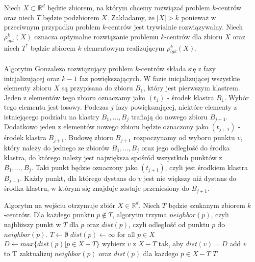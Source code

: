 \noindent
Niech $X \subset \mathbb{R}^{d}$ będzie zbiorem, na którym chcemy rozwiązać problem $k$-centrów oraz niech $T$ będzie podzbiorem $X$.
Zakładamy, że $|X| > k$ ponieważ w przeciwnym przypadku problem $k$-centrów jest trywialnie rozwiązywalny.
Niech $\rho_{opt}^{k}(X)$ oznacza optymalne rozwiązanie problemu $k$-centrów dla zbioru $X$ oraz niech $T^{*}$ będzie zbiorem $k$ elementowym realizującym $\rho_{opt}^{k}(X)$.
\\~\\
Algorytm Gonzaleza rozwiązujący problem $k$-centrów składa się z fazy inicjalizującej oraz $k-1$ faz powiększających.
W fazie inicjalizującej wszystkie elementy zbioru $X$ są przypisana do zbioru $B_{1}$, który jest pierwszym klastrem.
Jeden z elementów tego zbioru oznaczamy jako $(t_{1})$ - środek klastra $B_{1}$.
Wybór tego elementu jest losowy.
Podczas $j$ fazy powiększającej, niektóre elementy z istniejącego podziału na klastry $B_{1}, \dots, B_{j}$ trafiają do nowego zbioru $B_{j+1}$.
Dodatkowo jeden z elementów nowego zbioru będzie oznaczony jako $(t_{j+1})$ - środek klastra $B_{j+1}$.
Budowę zbioru $B_{j+1}$ rozpoczynamy od wyboru punktu $v$, który należy do jednego ze zbiorów $B_{1}, \dots, B_{j}$ oraz jego odległość do środka klastra, do którego należy jest największa spośród wszystkich punktów z $B_{1}, \dots, B_{j}$. 
Taki punkt będzie oznaczony jako $(t_{j+1})$, czyli jest środkiem klastra $B_{j+1}$.
Każdy punkt, dla którego dystans do $v$ jest nie większy niż dystans do środka klastru, w którym się znajduje zostaje przeniesiony do $B_{j+1}$.
\begin{algorithm}
    \caption{}
\begin{algorithmic}
    \State Algorytm na wejściu otrzymuje zbiór $X \in \mathbb{R}^{d}$.
    \State Niech $T$ będzie szukanym zbiorem $k$-centrów.
    \State Dla każdego punktu $p \notin T$, algorytm trzyma $neighbor(p)$, czyli najbliższy punkt w $T$ dla $p$ oraz $dist(p)$, czyli odległość od punktu $p$ do $neighbor(p)$.
        \State $T \leftarrow \emptyset$
        \State $dist(p) \leftarrow \infty$ for all $p \in X$
            \State $D \leftarrow max\{dist(p) | p \in X-T\}$
            \State wybierz $v$ z $X-T$ tak, aby $dist(v) = D$
            \State add $v$ to T
            \State zaktualizuj $neighbor(p)$ oraz $dist(p)$ dla każdego $p \in X-T$
        \EndWhile
    \EndProcedure
    \Return $T$
\end{algorithmic}
\end{algorithm}
